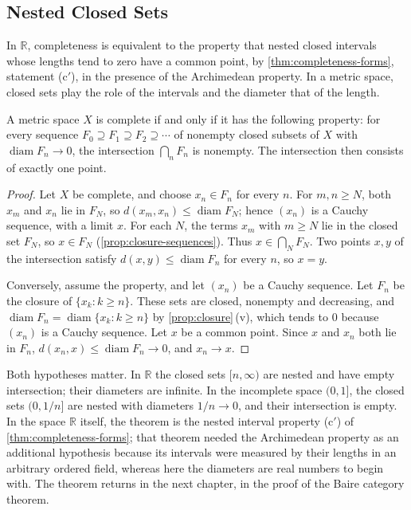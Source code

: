 \subsection{Nested Closed Sets}

In $\mathbb R$, completeness is equivalent to the property that nested closed intervals whose lengths tend to zero have a common point, by \cref{thm:completeness-forms}, statement (c$'$), in the presence of the Archimedean property. In a metric space, closed sets play the role of the intervals and the diameter that of the length.

\begin{theorem}
\label{thm:cantor-intersection}
A metric space $X$ is complete if and only if it has the following property: for every sequence $F_0\supseteq F_1\supseteq F_2\supseteq\cdots$ of nonempty closed subsets of $X$ with $\operatorname{diam}F_n\to0$, the intersection $\bigcap_nF_n$ is nonempty. The intersection then consists of exactly one point.
\end{theorem}

\begin{proof}
Let $X$ be complete, and choose $x_n\in F_n$ for every $n$. For $m,n\ge N$, both $x_m$ and $x_n$ lie in $F_N$, so $d(x_m,x_n)\le\operatorname{diam}F_N$; hence $(x_n)$ is a Cauchy sequence, with a limit $x$. For each $N$, the terms $x_m$ with $m\ge N$ lie in the closed set $F_N$, so $x\in F_N$ (\cref{prop:closure-sequences}). Thus $x\in\bigcap_NF_N$. Two points $x,y$ of the intersection satisfy $d(x,y)\le\operatorname{diam}F_n$ for every $n$, so $x=y$.

Conversely, assume the property, and let $(x_n)$ be a Cauchy sequence. Let $F_n$ be the closure of $\{x_k: k\ge n\}$. These sets are closed, nonempty and decreasing, and $\operatorname{diam}F_n=\operatorname{diam}\{x_k: k\ge n\}$ by \cref{prop:closure}\,(v), which tends to $0$ because $(x_n)$ is a Cauchy sequence. Let $x$ be a common point. Since $x$ and $x_n$ both lie in $F_n$, $d(x_n,x)\le\operatorname{diam}F_n\to0$, and $x_n\to x$.
\end{proof}

Both hypotheses matter. In $\mathbb R$ the closed sets $[n,\infty)$ are nested and have empty intersection; their diameters are infinite. In the incomplete space $(0,1]$, the closed sets $(0,1/n]$ are nested with diameters $1/n\to0$, and their intersection is empty. In the space $\mathbb R$ itself, the theorem is the nested interval property (c$'$) of \cref{thm:completeness-forms}; that theorem needed the Archimedean property as an additional hypothesis because its intervals were measured by their lengths in an arbitrary ordered field, whereas here the diameters are real numbers to begin with. The theorem returns in the next chapter, in the proof of the Baire category theorem.

